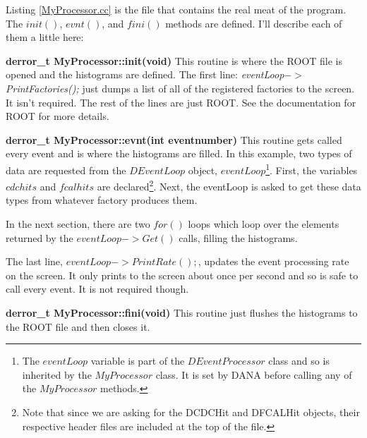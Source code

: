\documentclass[12pt]{article}
\begin{document}
\newpage
Listing \ref{MyProcessor.cc} is the file that contains the real meat
of the program. The $init()$, $evnt()$, and $fini()$ methods
are defined. I'll describe each of them a little here:

\begin{description}
\item{\bf derror\_t MyProcessor::init(void)}
This routine is where the ROOT file is opened and the histograms are
defined. The first line: {\it eventLoop$->$PrintFactories();} just
dumps a list of all of the registered factories to the screen. It isn't
required. The rest of the lines are just ROOT. See the documentation
for ROOT for more details.

\item{\bf derror\_t MyProcessor::evnt(int eventnumber)}
This routine gets called every event and is where the histograms
are filled. In this example, two types of data are requested from
the $DEventLoop$ object, $eventLoop$\footnote{The $eventLoop$ variable
is part of the $DEventProcessor$ class and so is inherited by
the $MyProcessor$ class. It is set by DANA before calling any of
the $MyProcessor$ methods.}. First, the variables $cdchits$ and
$fcalhits$ are declared\footnote{Note that since we are asking for
the DCDCHit and DFCALHit objects, their respective header files are
included at the top of the file.}. Next, the eventLoop is asked to
get these data types from whatever factory produces them.

In the next section, there are two $for()$ loops which loop over the elements returned by
the $eventLoop->Get()$ calls, filling the histograms.

The last line, $eventLoop->PrintRate();$, updates the event processing
rate on the screen. It only prints to the screen about once per second
and so is safe to call every event. It is not required though.

\item{\bf derror\_t MyProcessor::fini(void)}
This routine just flushes the histograms to the ROOT file and then closes it.
\end{description}


\end{document}
